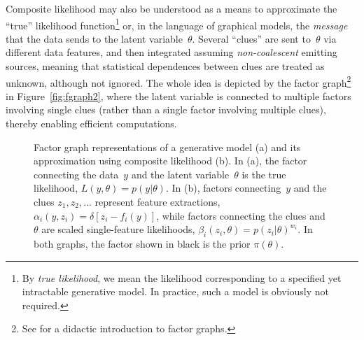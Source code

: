 \documentclass[english]{scrartcl}
\begin{document}
Composite likelihood may also be understood as a means to approximate the ``true'' likelihood function\footnote{By {\em true likelihood}, we mean the likelihood corresponding to a specified yet intractable generative model. In practice, such a model is obviously not required.} or, in the language of graphical models, the {\em message} that the data sends to the latent variable~$\theta$. Several ``clues'' are sent to~$\theta$ via different data features, and then integrated assuming {\em non-coalescent} emitting sources, meaning that statistical dependences between clues are treated as unknown, although not ignored. The whole idea is depicted by the factor graph\footnote{See \cite{Bishop-06} for a didactic introduction to factor graphs.} in Figure~\ref{fig:fgraph2}, where the latent variable is connected to multiple factors involving single clues (rather than a single factor involving multiple clues), thereby enabling efficient computations.


\begin{figure}[!ht]
\begin{center}
\caption{Factor graph representations of a generative model (a) and its approximation using composite likelihood (b). In (a), the factor connecting the data~$y$ and the latent variable~$\theta$ is the true likelihood, $L(y,\theta)=p(y|\theta)$. In (b), factors connecting~$y$ and the clues $z_1,z_2,\ldots$ represent feature extractions, $\alpha_i(y,z_i)=\delta[z_i-f_i(y)]$, while factors connecting the clues and~$\theta$ are scaled single-feature likelihoods, $\beta_i(z_i,\theta)=p(z_i|\theta)^{w_i}$. In both graphs, the factor shown in black is the prior $\pi(\theta)$.}
\label{fig:fgraph}
\end{center}
\end{figure}
\end{document}

